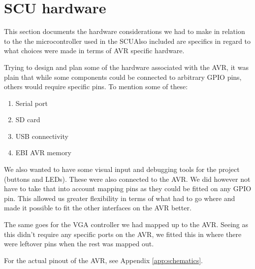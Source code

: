 \section{SCU hardware}

This section documents the hardware considerations we had to make in relation
to the the microcontroller used in the SCUAlso included are specifics in regard
to what choices were made in terms of AVR specific hardware. 

Trying to design and plan some of the hardware associated with the AVR, it was
plain that while some components could be connected to arbitrary GPIO pins,
others would require specific pins. To mention some of these:

\begin{enumerate}
\item Serial port
\item \ac{SD} card
\item \ac{USB} connectivity
\item \ac{EBI} AVR memory
\end{enumerate}

We also wanted to have some visual input and debugging tools for the project
(buttons and LEDs). These were also connected to the AVR. We did however not
have to take that into account mapping pins as they could be fitted on any
\ac{GPIO} pin. This allowed us greater flexibility in terms of what had to go
where and made it possible to fit the other interfaces on the AVR better.

The same goes for the \ac{VGA} controller we had mapped up to the AVR. Seeing
as this didn't require any specific ports on the AVR, we fitted this in where
there were leftover pins when the rest was mapped out.

For the actual pinout of the AVR, see Appendix \ref{app:schematics}.

